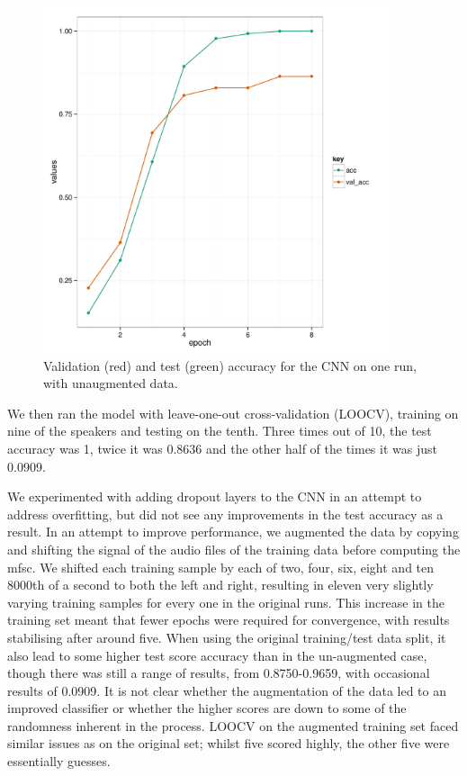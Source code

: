 \documentclass{article} %
\begin{document}
\begin{figure}[h]
\begin{center}
\includegraphics[height = 4in, width = 4in]{cnn_2d_plot_acc.pdf}
\end{center}
\caption{Validation (red) and test (green) accuracy for the CNN on one run, with unaugmented data.}
\label{fig:2d_acc}
\end{figure}

We then ran the model with leave-one-out cross-validation (LOOCV), training on nine of the speakers and testing on the tenth. Three times out of 10, the test accuracy was 1, twice it was 0.8636 and the other half of the times it was just 0.0909.

We experimented with adding dropout layers to the CNN in an attempt to address overfitting, but did not see any improvements in the test accuracy as a result. In an attempt to improve performance, we augmented the data by copying and shifting the signal of the audio files of the training data before computing the mfsc. We shifted each training sample by each of two, four, six, eight and ten 8000th of a second to both the left and right, resulting in eleven very slightly varying training samples for every one in the original runs. This increase in the training set meant that fewer epochs were required for convergence, with results stabilising after around five. When using the original training/test data split, it also lead to some higher test score accuracy than in the un-augmented case, though there was still a range of results, from 0.8750-0.9659, with occasional results of 0.0909. It is not clear whether the augmentation of the data led to an improved classifier or whether the higher scores are down to some of the randomness inherent in the process.
LOOCV on the augmented training set faced similar issues as on the original set; whilst five scored highly, the other five were essentially guesses.
\end{document}
